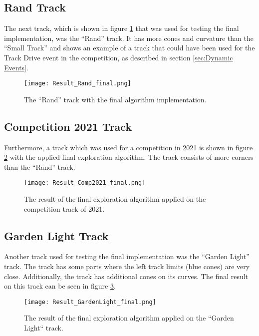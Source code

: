 \subsection{Rand Track} \label{sec:Results Rand Track}
The next track, which is shown in figure \ref{fig:Result Rand Final} that was used for testing the final implementation, was the ``Rand'' track. It has more cones and curvature than the ``Small Track'' and shows an example of a track that could have been used for the Track Drive event in the competition, as described in section \ref{sec:Dynamic Events}.
\begin{figure}[H]
    \centering
    \texttt{[image: Result\_Rand\_final.png]}
    \caption{The ``Rand'' track with the final algorithm implementation.}
    \label{fig:Result Rand Final}
\end{figure}

\subsection{Competition 2021 Track} \label{sec:Results Competition 2021 Track}
Furthermore, a track which was used for a competition in 2021 is shown in figure \ref{fig:Result Comp 2021 Final} with the applied final exploration algorithm. The track consists of more corners than the ``Rand'' track.
\begin{figure}[H]
    \centering
    \texttt{[image: Result\_Comp2021\_final.png]}
    \caption{The result of the final exploration algorithm applied on the competition track of 2021.}
    \label{fig:Result Comp 2021 Final}
\end{figure}

\subsection{Garden Light Track} \label{sec:Results Garden Light Track}
Another track used for testing the final implementation was the ``Garden Light'' track. The track has some parts where the left track limits (blue cones) are very close. Additionally, the track has additional cones on its curves. The final result on this track can be seen in figure \ref{fig:Result Garden Light Final}.
\begin{figure}[H]
    \centering
    \texttt{[image: Result\_GardenLight\_final.png]}
    \caption{The result of the final exploration algorithm applied on the ``Garden Light`` track.}
    \label{fig:Result Garden Light Final}
\end{figure}

